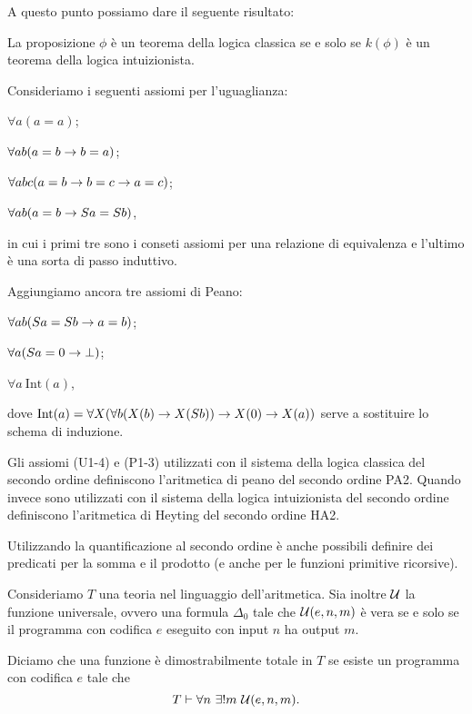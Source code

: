 \documentclass[]{marticle}
\begin{document}
A questo punto possiamo dare il seguente risultato:
\begin{block}[Proposizione]
    La proposizione $\phi$ \`e un teorema della logica classica se e solo se
    $k(\phi)$ \`e un teorema della logica intuizionista.
\end{block}

Consideriamo i seguenti assiomi per l'uguaglianza:
\begin{nlist}[U1]
    \item $\forall a (a=a)$;
    \item $\forall ab (a=b\rightarrow b=a)$;
    \item $\forall abc (a=b \rightarrow b=c \rightarrow a=c)$;
    \item $\forall ab(a=b \rightarrow Sa = Sb)$,
\end{nlist}
in cui i primi tre sono i conseti assiomi per una relazione di equivalenza e
l'ultimo \`e una sorta di passo induttivo.

Aggiungiamo ancora tre assiomi di Peano:
\begin{nlist}[PA1]
    \item $\forall ab(Sa =Sb \rightarrow a = b)$;
    \item $\forall a(Sa=0 \rightarrow \bot)$;
    \item $\forall a\ \text{Int}(a)$,
\end{nlist}
dove $\text{Int}(a) = \forall X(\forall b (X(b)\rightarrow X(Sb)) \rightarrow X(0) \rightarrow X(a))$
serve a sostituire lo schema di induzione.

\begin{block}[Definizione]
    Gli assiomi (U1-4) e (P1-3) utilizzati con il sistema della logica classica
    del secondo ordine definiscono l'aritmetica di peano del secondo ordine PA2.
    Quando invece sono utilizzati con il sistema della logica intuizionista del
    secondo ordine definiscono l'aritmetica di Heyting del secondo ordine HA2.
\end{block}

Utilizzando la quantificazione al secondo ordine \`e anche possibili definire
dei predicati per la somma e il prodotto (e anche per le funzioni primitive
ricorsive).

Consideriamo $T$ una teoria nel linguaggio dell'aritmetica. Sia inoltre $\mathcal{U}$
la funzione universale, ovvero una formula $\Delta_0$ tale che $\mathcal{U} (e, n, m)$
\`e vera se e solo se il programma con codifica $e$ eseguito con input $n$ ha
output $m$. 

Diciamo che una funzione \`e dimostrabilmente totale in $T$ se esiste un
programma con codifica $e$ tale che
\[
    T \vdash \forall n\ \exists ! m\ \uni(e, n, m).
\]
\end{document}
